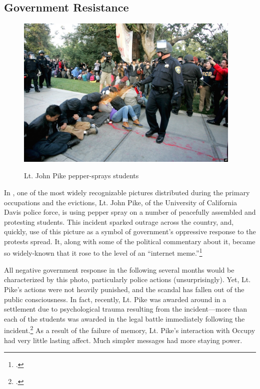 \documentclass[openany,twoside]{memoir}
\begin{document}
\begin{Spacing}{2}
\subsection{Government Resistance}
\begin{figure}[h]
   \centering
   \caption{Lt. John Pike pepper-sprays students}
   \includegraphics[width=4.25in]{graphics/pike.jpg}
   \label{spraycop}
\end{figure}

In , one of the most widely recognizable pictures distributed during the primary occupations and the evictions, Lt. John Pike, of the University of California Davis police force, is using pepper spray on a number of peacefully assembled and protesting students.
This incident sparked outrage across the country, and, quickly, use of this picture as a symbol of government's oppressive response to the protests spread.
It, along with some of the political commentary about it, became so widely-known that it rose to the level of an ``internet meme.''\footcite{scott11}

All negative government response in the following several months would be characterized by this photo, particularly police actions (unsurprisingly).
Yet, Lt. Pike's actions were not heavily punished, and the scandal has fallen out of the public consciousness.
In fact, recently, Lt. Pike was awarded around  in a settlement due to psychological trauma resulting from the incident---more than each of the students was awarded in the legal battle immediately following the incident.\footcite{goyette13}
As a result of the failure of memory, Lt. Pike's interaction with Occupy had very little lasting affect.
Much simpler messages had more staying power.


\end{Spacing}
\end{document}
